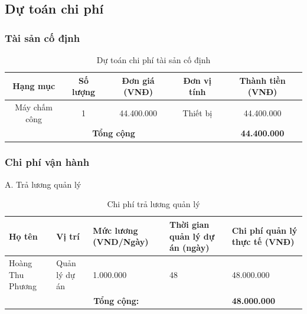 \subsection{Dự toán chi phí}
\subsubsection{Tài sản cố định}
\begin{table}[H]
    \caption{Dự toán chi phí tài sản cố định}
    \centering
    \renewcommand{\arraystretch}{1.5} %
    \begin{tabular}{|c|c|c|c|c|}
        \hline
        \textbf{Hạng mục}                        & \textbf{Số lượng}   & \textbf{Đơn giá (VNĐ)} & \textbf{Đơn vị tính} & \textbf{Thành tiền (VNĐ)} \\
        \hline
        Máy chấm công                            & 1                   & 44.400.000             & Thiết bị             & 44.400.000                \\
        \hline
        \multicolumn{4}{|c|}{\textbf{Tổng cộng}} & \textbf{44.400.000}                                                                             \\
        \hline
    \end{tabular}
\end{table}


\subsubsection{Chi phí vận hành}
A. Trả lương quản lý
\begin{table}[H]
    \centering
    \renewcommand{\arraystretch}{1.5} %
    \begin{tabular}{|p{3cm}|p{2.5cm}|p{2.3cm}|p{2cm}|p{3cm}|}
        \hline
        \textbf{Họ tên}                           & \textbf{Vị trí}     & \textbf{Mức lương (VND/Ngày)} & \textbf{Thời gian quản lý dự án (ngày)} & \textbf{Chi phí quản lý thực tế (VNĐ)} \\
        \hline
        Hoàng Thu Phương                          & Quản lý dự án       & 1.000.000                     & 48                                      & 48.000.000                             \\
        \hline
        \multicolumn{4}{|c|}{\textbf{Tổng cộng:}} & \textbf{48.000.000}                                                                                                                    \\
        \hline
    \end{tabular}
    \caption{Chi phí trả lương quản lý}
\end{table}

